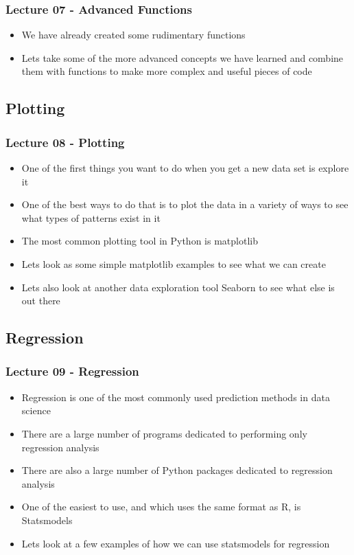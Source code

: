 \documentclass[mini frame in current subsection]{beamer}
\begin{document}
		\begin{frame}
			\frametitle{Lecture 07 - Advanced Functions}
			\begin{itemize}
				\vfill\item  We have already created some rudimentary functions
				\vfill\item  Lets take some of the more advanced concepts we have learned and combine them with functions to make more complex and useful pieces of code
			\end{itemize}
		\end{frame}
		
	\subsection{Plotting}
	
		\begin{frame}
			\frametitle{Lecture 08 - Plotting}
			\begin{itemize}
				\vfill\item  One of the first things you want to do when you get a new data set is explore it
				\vfill\item  One of the best ways to do that is to plot the data in a variety of ways to see what types of patterns exist in it
				\vfill\item  The most common plotting tool in Python is matplotlib
				\vfill\item  Lets look as some simple matplotlib examples to see what we can create
				\vfill\item  Lets also look at another data exploration tool Seaborn to see what else is out there
			\end{itemize}
		\end{frame}
		
	\subsection{Regression}
	
		\begin{frame}
			\frametitle{Lecture 09 - Regression}
			\begin{itemize}
				\vfill\item  Regression is one of the most commonly used prediction methods in data science
				\vfill\item  There are a large number of programs dedicated to performing only regression analysis
				\vfill\item  There are also a large number of Python packages dedicated to regression analysis
				\vfill\item  One of the easiest to use, and which uses the same format as R, is Statsmodels
				\vfill\item  Lets look at a few examples of how we can use statsmodels for regression
			\end{itemize}
		\end{frame}
		
\end{document}
